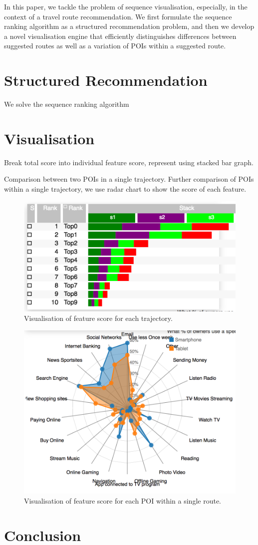 \documentclass[sigconf]{acmart}
\begin{document}
In this paper, we tackle the problem of sequence visualisation, especially, in the context of a travel route recommendation. We first formulate the sequence ranking algorithm as a structured recommendation problem, and then we develop a novel visualisation engine that efficiently distinguishes differences between suggested routes as well as a variation of POIs within a suggested route. 

\section{Structured Recommendation}
We solve the sequence ranking algorithm


\section{Visualisation}
Break total score into individual feature score, represent using stacked bar graph.

Comparison between two POIs in a single trajectory.
Further comparison of POIs within a single trajectory, we use radar chart to show the score of each feature.


\begin{figure}[t!]
\includegraphics[width=0.9\linewidth]{figure/sample_stack.png}
\caption{Visualisation of feature score for each trajectory.}
\end{figure}

\begin{figure}[t!]
\includegraphics[width=0.9\linewidth]{figure/sample_radar.png}
\caption{Visualisation of feature score for each POI within a single route.}
\end{figure}


\section{Conclusion}



 
\end{document}
